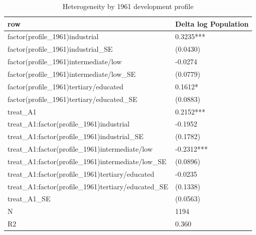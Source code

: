 \begin{table}

\caption{Heterogeneity by 1961 development profile}
\centering
\begin{tabular}[t]{ll}
\toprule
row & Delta log Population\\
\midrule
factor(profile\_1961)industrial & 0.3235***\\
factor(profile\_1961)industrial\_SE & (0.0430)\\
factor(profile\_1961)intermediate/low & -0.0274\\
factor(profile\_1961)intermediate/low\_SE & (0.0779)\\
factor(profile\_1961)tertiary/educated & 0.1612*\\
\addlinespace
factor(profile\_1961)tertiary/educated\_SE & (0.0883)\\
treat\_A1 & 0.2152***\\
treat\_A1:factor(profile\_1961)industrial & -0.1952\\
treat\_A1:factor(profile\_1961)industrial\_SE & (0.1782)\\
treat\_A1:factor(profile\_1961)intermediate/low & -0.2312***\\
\addlinespace
treat\_A1:factor(profile\_1961)intermediate/low\_SE & (0.0896)\\
treat\_A1:factor(profile\_1961)tertiary/educated & -0.0235\\
treat\_A1:factor(profile\_1961)tertiary/educated\_SE & (0.1338)\\
treat\_A1\_SE & (0.0563)\\
N & 1194\\
\addlinespace
R2 & 0.360\\
\bottomrule
\end{tabular}
\end{table}
